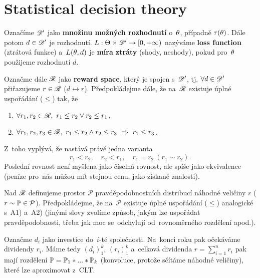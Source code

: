 \section{Statistical decision theory}

\begin{define}
	Označíme $\mathscr{D}'$ jako \textbf{množinu možných rozhodnutí} o~$\theta$, případně $\tau(\theta)$. Dále potom $d\in\mathscr{D}'$ je rozhodnutí. $L:\Theta\times\mathscr{D}'\to[0,+\infty)$ nazýváme \textbf{loss function} (ztrátová funkce) a~$L(\theta,d)$ je \textbf{míra ztráty} (shody, neshody), pokud pro~$\theta$ použijeme rozhodnutí $d$.
	
	Označme dále $\mathscr{R}$ jako \textbf{reward space}, který je spojen s~$\mathscr{D}'$, tj. $\forall d\in\mathscr{D}'$ přiřazujeme $r\in\mathscr{R}$ ($d\leftrightarrow r$). Předpokládejme dále, že na~$\mathscr{R}$ existuje úplné uspořádání ($\leq$) tak, že \begin{enumerate}[{A}1)]
		\item $\forall r_1,r_2\in\mathscr{R},~r_1\leq r_2 \vee r_2\leq r_1$,
		\item $\forall r_1,r_2,r_3\in\mathscr{R},~r_1\leq r_2 \wedge r_2\leq r_3~\Rightarrow~r_1\leq r_3$. 
	\end{enumerate}Z~toho vyplývá, že nastává právě jedna varianta
	$$ r_1<r_2,\quad r_2<r_1,\quad r_1=r_2~(r_1\sim r_2).$$
	Poslední rovnost není myšlena jako číselná rovnost, ale spíše jako ekvivalence (peníze pro~nás můžou mít stejnou cenu, jako získané znalosti).
	
	Nad $\mathscr{R}$ definujeme prostor $\mathcal{P}$ pravděpodobnostních distribucí náhodné veličiny $r$ ($r\sim\mathbb{P}\in\mathcal{P}$). Předpokládejme, že na~$\mathcal{P}$ existuje úplné uspořádání ($\leq$) analogické s~A1) a~A2) (jinými slovy zvolíme způsob, jakým lze uspořádat pravděpodobnosti, třeba jak moc se~odchylují od~rovnoměrného rozdělení apod.).
\end{define}

\begin{example}[Motivace] 
	Označme $d_i$ jako investice do~$i$-té společnosti. Na~konci roku pak očekáváme dividendy $r_i$. Máme tedy $(d_i)_1^k$, $(r_i)_1^k$ a~celková dividenda $r=\sum_{i=1}^n r_i$ pak mají rozdělení $\mathbb{P}=\mathbb{P}_1\ast...\ast\mathbb{P}_k$ (konvoluce, protože sčítáme náhodné veličiny), které lze aproximovat z~CLT.
\end{example}

